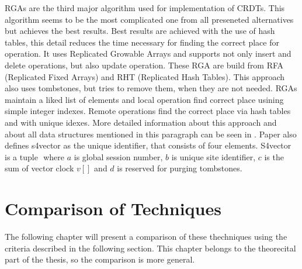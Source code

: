 \documentclass[12pt,oneside]{fithesis2}
\begin{document}
\par RGAs are the third major algorithm used for implementation of CRDTs. This algorithm seems to be the most complicated one from all preseneted alternatives but achieves the best results. Best results are achieved with the use of hash tables, this detail reduces the time necessary for finding the correct place for operation.  It uses Replicated Growable Arrays and supports not only insert and delete operations, but also update operation. These RGA are build from RFA (Replicated Fixed Arrays) and RHT (Replicated Hash Tables). This approach also uses tombstones, but tries to remove them, when they are not needed. RGAs maintain a liked list of elements and local operation find correct place usining simple integer indexes. Remote operations find the correct place via hash tables and with unique idexes. More detailed information about this approach and about all data structures mentioned in this paragraph can be seen in \cite{RGA}. Paper also defines s4vector as the unique identifier, that consists of four elements. S4vector is a tuple \(<a,b,c,d>\) where \(a\) is global session number, \(b\) is unique site identifier, \(c\) is the sum of vector clock \(v[]\) and \(d\) is reserved for purging tombstones. 
\chapter{Comparison of Techniques}
The following chapter will present a comparison of these thechniques using the criteria described in the following section. This chapter belongs to the theorecital part of the thesis, so the comparison is more general. 
\end{document}

